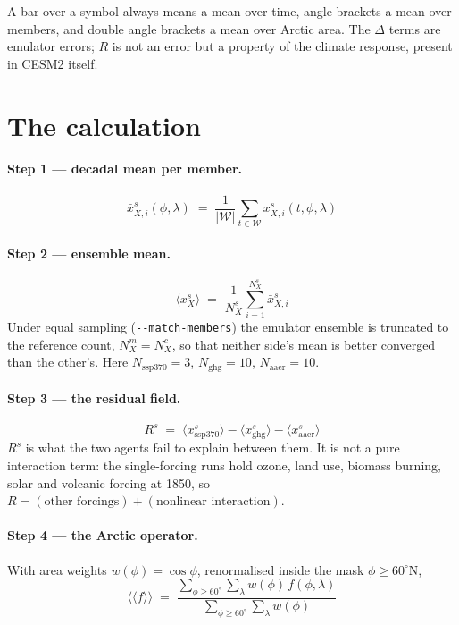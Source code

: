 \documentclass[11pt]{article}
\newcommand{\Xssp}{\mathrm{ssp370}}
\newcommand{\Xghg}{\mathrm{ghg}}
\newcommand{\Xaer}{\mathrm{aaer}}
\newcommand{\ameanN}[1]{\bigl\langle\!\bigl\langle #1 \bigr\rangle\!\bigr\rangle}
\begin{document}
A bar over a symbol always means a mean over time, angle brackets a mean
over members, and double angle brackets a mean over Arctic area. The
$\Delta$ terms are emulator errors; $R$ is not an error but a property of
the climate response, present in CESM2 itself.

\section*{The calculation}

\paragraph{Step 1 --- decadal mean per member.}
\begin{equation}
\bar{x}^{s}_{X,i}(\phi,\lambda)
  \;=\; \frac{1}{|\mathcal{W}|}\sum_{t\in\mathcal{W}}
        x^{s}_{X,i}(t,\phi,\lambda)
\end{equation}

\paragraph{Step 2 --- ensemble mean.}
\begin{equation}
\bigl\langle x^{s}_{X}\bigr\rangle
  \;=\; \frac{1}{N^{s}_{X}}\sum_{i=1}^{N^{s}_{X}} \bar{x}^{s}_{X,i}
\end{equation}
Under equal sampling (\texttt{-{}-match-members}) the emulator ensemble is
truncated to the reference count, $N^{m}_{X}=N^{c}_{X}$, so that neither
side's mean is better converged than the other's. Here
$N_{\Xssp}=3$, $N_{\Xghg}=10$, $N_{\Xaer}=10$.

\paragraph{Step 3 --- the residual field.}
\begin{equation}
R^{s} \;=\; \bigl\langle x^{s}_{\Xssp}\bigr\rangle
          - \bigl\langle x^{s}_{\Xghg}\bigr\rangle
          - \bigl\langle x^{s}_{\Xaer}\bigr\rangle
\label{eq:R}
\end{equation}
$R^{s}$ is what the two agents fail to explain between them. It is not a
pure interaction term: the single-forcing runs hold ozone, land use,
biomass burning, solar and volcanic forcing at 1850, so
$R=(\text{other forcings})+(\text{nonlinear interaction})$.

\paragraph{Step 4 --- the Arctic operator.}
With area weights $w(\phi)=\cos\phi$, renormalised inside the mask
$\phi\geq 60^{\circ}\mathrm{N}$,
\begin{equation}
\ameanN{f}
  \;=\;
  \frac{\displaystyle\sum_{\phi\geq 60^{\circ}}\sum_{\lambda}
        w(\phi)\, f(\phi,\lambda)}
       {\displaystyle\sum_{\phi\geq 60^{\circ}}\sum_{\lambda} w(\phi)}
\end{equation}
\end{document}

